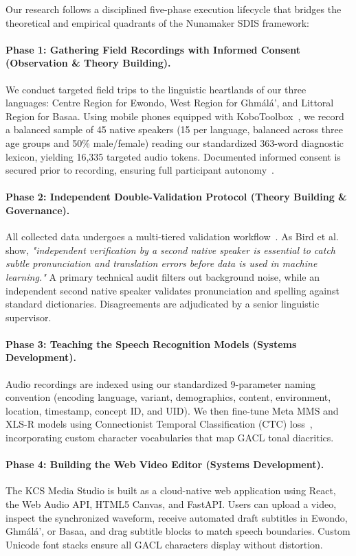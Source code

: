 \documentclass[a4paper,11pt]{article}
\begin{document}
Our research follows a disciplined five-phase execution lifecycle that bridges the theoretical and empirical quadrants of the Nunamaker SDIS framework:

\paragraph{Phase 1: Gathering Field Recordings with Informed Consent (Observation \& Theory Building).}
We conduct targeted field trips to the linguistic heartlands of our three languages: Centre Region for Ewondo, West Region for Gh\textopeno m\'al\'a', and Littoral Region for Basaa. Using mobile phones equipped with KoboToolbox~\cite{kobotoolbox2024}, we record a balanced sample of 45 native speakers (15 per language, balanced across three age groups and 50\% male/female) reading our standardized 363-word diagnostic lexicon, yielding 16,335 targeted audio tokens. Documented informed consent is secured prior to recording, ensuring full participant autonomy~\cite{grenoble2010language}.

\paragraph{Phase 2: Independent Double-Validation Protocol (Theory Building \& Governance).}
All collected data undergoes a multi-tiered validation workflow~\cite{bird2014coscab}. As Bird et al.~\cite{bird2014coscab} show, \textit{"independent verification by a second native speaker is essential to catch subtle pronunciation and translation errors before data is used in machine learning."} A primary technical audit filters out background noise, while an independent second native speaker validates pronunciation and spelling against standard dictionaries. Disagreements are adjudicated by a senior linguistic supervisor.

\paragraph{Phase 3: Teaching the Speech Recognition Models (Systems Development).}
Audio recordings are indexed using our standardized 9-parameter naming convention (encoding language, variant, demographics, content, environment, location, timestamp, concept ID, and UID). We then fine-tune Meta MMS and XLS-R models using Connectionist Temporal Classification (CTC) loss~\cite{graves2006connectionist}, incorporating custom character vocabularies that map GACL tonal diacritics.

\paragraph{Phase 4: Building the Web Video Editor (Systems Development).}
The KCS Media Studio is built as a cloud-native web application using React, the Web Audio API, HTML5 Canvas, and FastAPI. Users can upload a video, inspect the synchronized waveform, receive automated draft subtitles in Ewondo, Gh\textopeno m\'al\'a', or Basaa, and drag subtitle blocks to match speech boundaries. Custom Unicode font stacks ensure all GACL characters display without distortion.
\end{document}
